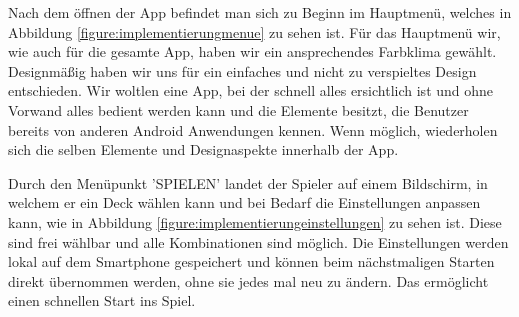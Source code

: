 Nach dem öffnen der App befindet man sich zu Beginn im Hauptmenü, welches in Abbildung \ref{figure:implementierungmenue} zu sehen ist. Für das Hauptmenü wir, wie auch für die gesamte App, haben wir ein ansprechendes Farbklima gewählt. Designmäßig haben wir uns für ein einfaches und nicht zu verspieltes Design entschieden. Wir woltlen eine App, bei der schnell alles ersichtlich ist und ohne Vorwand alles bedient werden kann und die Elemente besitzt, die Benutzer bereits von anderen Android Anwendungen kennen. Wenn möglich, wiederholen sich die selben Elemente und Designaspekte innerhalb der App.

Durch den Menüpunkt 'SPIELEN' landet der Spieler auf einem Bildschirm, in welchem er ein Deck wählen kann und bei Bedarf die Einstellungen anpassen kann, wie in Abbildung \ref{figure:implementierungeinstellungen} zu sehen ist. Diese sind frei wählbar und alle Kombinationen sind möglich. Die Einstellungen werden lokal auf dem Smartphone gespeichert und können beim nächstmaligen Starten direkt übernommen werden, ohne sie jedes mal neu zu ändern. Das ermöglicht einen schnellen Start ins Spiel.\\

